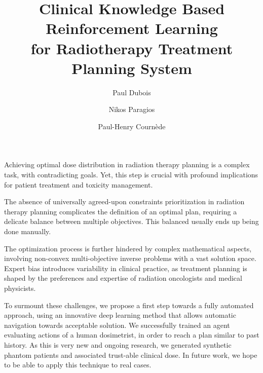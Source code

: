 \documentclass[11pt,twocolumn,twoside]{article}
\begin{document}
\title{Clinical Knowledge Based Reinforcement Learning\\for Radiotherapy Treatment Planning System}

\author[1,2]{Paul Dubois}
\author[1]{Nikos Paragios}
\author[2]{Paul-Henry Cournède}



\maketitle
\thispagestyle{fancy}





\begin{customabstract}
	Achieving optimal dose distribution in radiation therapy planning is a complex task, with contradicting goals.
	Yet, this step is crucial with profound implications for patient treatment and toxicity management.
	
	The absence of universally agreed-upon constraints prioritization in radiation therapy planning complicates the definition of an optimal plan, requiring a delicate balance between multiple objectives.
	This balanced usually ends up being done manually.
	
	The optimization process is further hindered by complex mathematical aspects, involving non-convex multi-objective inverse problems with a vast solution space.
	Expert bias introduces variability in clinical practice, as treatment planning is shaped by the preferences and expertise of radiation oncologists and medical physicists.
	
	To surmount these challenges, we propose a first step towards a fully automated approach, using an innovative deep learning method that allows automatic navigation towards acceptable solution.
	We successfully trained an agent evaluating actions of a human dosimetrist, in order to reach a plan similar to past history.
	As this is very new and ongoing research, we generated synthetic phantom patients and associated trust-able clinical dose.
	In future work, we hope to be able to apply this technique to real cases.
\end{customabstract}
\end{document}

